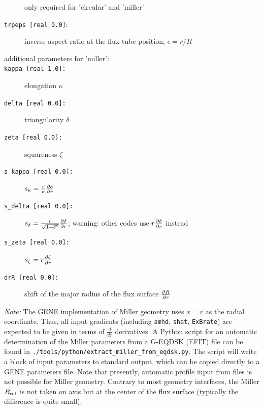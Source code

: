 \documentclass[12pt]{article}
\begin{document}
\begin{description}
 only required for 'circular' and 'miller'
\item[\hypertarget{trpeps}{\texttt{trpeps [real 0.0]}}:] inverse aspect ratio at the flux tube position, $\epsilon=r/R$
%
\item[additional parameters for \hypertarget{desc:miller}{'miller'}:]
\item[\texttt{kappa [real 1.0]:}] elongation $\kappa$
\item[\texttt{delta [real 0.0]:}] triangularity $\delta$
\item[\texttt{zeta [real 0.0]:}] squareness $\zeta$
\item[\texttt{s\_kappa [real 0.0]:}] $s_\kappa = \frac{r}{\kappa} \frac{\partial \kappa}{\partial r}$
\item[\texttt{s\_delta [real 0.0]:}] $s_\delta = \frac{r}{\sqrt{1-\delta^2}} \frac{\partial \delta}{\partial r}$; warning: other codes use $r \frac{\partial \delta}{\partial r}$ instead
\item[\texttt{s\_zeta [real 0.0]:}]  $s_\zeta = r \frac{\partial \zeta}{\partial r}$
\item[\texttt{drR [real 0.0]:}] shift of the major radius of the flux surface $\frac{\partial R}{\partial r}$
\end{description}
{\em Note:} The GENE implementation of Miller geometry uses $x=r$ as the radial coordinate. 
Thus, all input gradients (including {\tt amhd}, {\tt shat}, {\tt ExBrate}) are expected to be 
given in terms of $\frac{d}{dr}$ derivatives. A Python script for an automatic determination of 
the Miller parameters from a G-EQDSK (EFIT) file can be found in {\tt ./tools/python/extract\_miller\_from\_eqdsk.py}. 
The script will write a block of input parameters to standard output, which can be copied directly 
to a GENE parameters file. Note that presently, automatic profile input from files is not possible for Miller geometry.
Contrary to most geometry interfaces, the Miller $B_{\rm ref}$ is not taken on axis but at the center 
of the flux surface (typically the difference is quite small).
%
\end{document}
